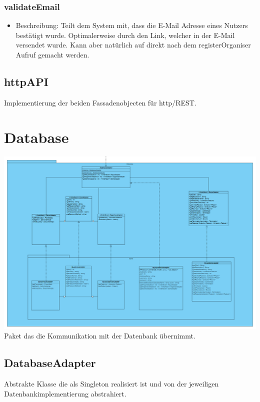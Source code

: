 \documentclass[a4paper]{scrreprt}
\begin{document}
    \subsubsection{validateEmail}
    \begin{itemize}
        \item Beschreibung: Teilt dem System mit, dass die E-Mail Adresse eines Nutzers bestätigt wurde. Optimalerweise durch den Link, welcher in der E-Mail versendet wurde. Kann aber natürlich auf direkt nach dem registerOrganiser Aufruf gemacht werden.
    \end{itemize}
    \subsection{httpAPI}
    Implementierung der beiden Fassadenobjecten für http/REST.

	
	\section{Database}
	\includegraphics[width=\textwidth]{img/Database.PNG}
	Paket das die Kommunikation mit der Datenbank übernimmt.
	
	\subsection{DatabaseAdapter}
	Abstrakte Klasse die als Singleton realisiert ist und von der jeweiligen Datenbankimplementierung abstrahiert.
	
\end{document}
